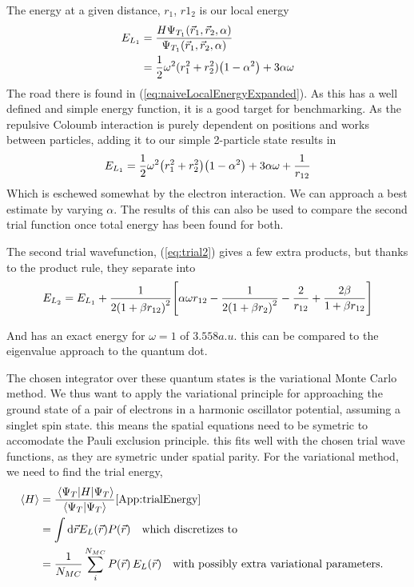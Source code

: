 \documentclass[10pt]{revtex4-1}
\begin{document}
The energy at a given distance, $r_1$, $r1_2$ is our local energy
\begin{align}
    E_{L_1} &= \frac{H \Psi_{T_1} \qty(\vec{r}_1, \vec{r}_2, \alpha )}{\Psi_{T_1} \qty(\vec{r}_1, \vec{r}_2, \alpha )}\nonumber \\
        &= \frac{1}{2}\omega^2 (r_1^2 + r_2^2)\qty(1 -\alpha^2 ) + 3\alpha \omega \label{eq:naiveLocalEnergy}
\end{align}
The road there is found in (\ref{eq:naiveLocalEnergyExpanded}). As this has a well defined and simple energy function, it is a good target for benchmarking.
As the repulsive Coloumb interaction is purely dependent on positions
and works between particles, adding it to our simple 2-particle state results in
\begin{align}
    E_{L_1} = \frac{1}{2} \omega^2 \qty(r_1^2 + r_2^2) \qty( 1 -\alpha^2 ) + 3\alpha \omega + \frac{1}{ r_{12} } \label{eq:firstLocalEnergy}
\end{align}
Which is eschewed somewhat by the electron interaction. We can approach a best estimate by varying $\alpha$. The results of this can also be used to compare
the second trial function once total energy has been found for both.

The second trial wavefunction, (\ref{eq:trial2}) gives a few extra products, but thanks to the product rule, they separate into
\begin{align}
    E_{L_2} = E_{L_1} + \frac{1}{ 2 \qty( 1 + \beta r_{12} )^{2} }
    \qty[ \alpha \omega r_{12} - \frac{ 1 }{ 2 \qty( 1 + \beta r_{2} )^{2} } - \frac{ 2 }{ r_{12} } + \frac{ 2 \beta }{ 1 + \beta r_{12} } ]
\end{align}

And has an exact energy for $\omega = 1$ of $3.558a.u$. this can be compared to the eigenvalue approach to the quantum dot\cite{project2pdf}.

The chosen integrator over these quantum states is the variational Monte Carlo method. We thus want to apply the variational principle for approaching
the ground state of a pair of electrons in a harmonic oscillator potential, assuming a singlet spin state. this means the spatial equations need to be
symetric to accomodate the Pauli exclusion principle. %
this fits well with the chosen trial wave functions, as they are symetric under spatial parity. For the variational method, we need to find the trial
energy,
\begin{align}
    \ev{H} &= \frac{ \ev{H}{\Psi_T} }{ \braket{\Psi_T} }\ref{App:trialEnergy} \nonumber \\
        &= \int\dd\vec{r} E_L\qty(\vec{r}) P\qty(\vec{r}) \qq{which discretizes to } \nonumber \\
        &= \frac{1}{N_{MC}}\sum_i^{N_{MC}} P(\vec{r}) \, E_L(\vec{r}) \qq{with possibly extra variational parameters.}
\end{align}
\end{document}
